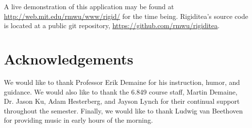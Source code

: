 \documentclass[aps,prd,final,twocolumn,letterpaper,nofootinbib]{revtex4-1}
\begin{document}
A live demonstration of this application may be found at
\url{http://web.mit.edu/rmwu/www/rigid/} for the time being.
Rigiditea's source code is located at a public git repository,
\url{https://github.com/rmwu/rigiditea}.

\section*{Acknowledgements}

We would like to thank Professor Erik Demaine for his instruction,
humor, and guidance. We would also like to thank the 6.849 course staff,
Martin Demaine, Dr. Jason Ku, Adam Hesterberg, and Jayson Lynch
for their continual support throughout the semester.
Finally, we would like to thank Ludwig van Beethoven for providing
music in early hours of the morning.

{}

\end{document}

